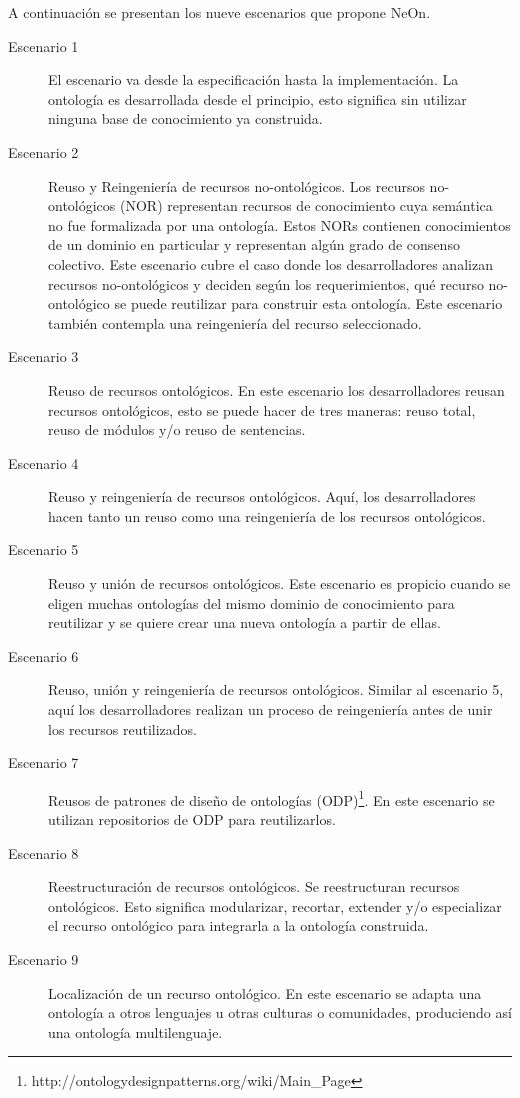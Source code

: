 A continuación se presentan los nueve escenarios que propone NeOn.

\begin{description}
    \item[Escenario 1] El escenario va desde la especificación hasta la implementación. La ontología es desarrollada desde el principio, esto significa sin utilizar ninguna base de conocimiento ya construida.
    \item[Escenario 2] Reuso y Reingeniería de recursos no-ontológicos. Los recursos no-ontológicos (NOR)\cite{ReusoRecursoNoOntologico} representan recursos de conocimiento cuya semántica no fue formalizada por una ontología. Estos NORs contienen conocimientos de un dominio en particular y representan algún grado de consenso colectivo. Este escenario cubre el caso donde los desarrolladores analizan recursos no-ontológicos y deciden según los requerimientos, qué recurso no-ontológico se puede reutilizar para construir esta ontología. Este escenario también contempla una reingeniería del recurso seleccionado.
    \item[Escenario 3] Reuso de recursos ontológicos. En este escenario los desarrolladores reusan recursos ontológicos, esto se puede hacer de tres maneras: reuso total, reuso de módulos y/o reuso de sentencias.
    \item[Escenario 4] Reuso y reingeniería de recursos ontológicos. Aquí, los desarrolladores hacen tanto un reuso como una reingeniería de los recursos ontológicos.
    \item[Escenario 5] Reuso y unión de recursos ontológicos. Este escenario es propicio cuando se eligen muchas ontologías del mismo dominio de conocimiento para reutilizar y se quiere crear una nueva ontología a partir de ellas.
    \item[Escenario 6] Reuso, unión y reingeniería de recursos ontológicos. Similar al escenario 5, aquí los desarrolladores realizan un proceso de reingeniería antes de unir los recursos reutilizados.
    \item[Escenario 7] Reusos de patrones de diseño de ontologías (ODP)\footnote{http://ontologydesignpatterns.org/wiki/Main\_Page}. En este escenario se utilizan repositorios de ODP para reutilizarlos.
    \item[Escenario 8] Reestructuración de recursos ontológicos. Se reestructuran recursos ontológicos. Esto significa modularizar, recortar, extender y/o especializar el recurso ontológico para integrarla a la ontología construida.
    \item[Escenario 9] Localización de un recurso ontológico. En este escenario se adapta una ontología a otros lenguajes u otras culturas o comunidades, produciendo así una ontología multilenguaje.
\end{description}

